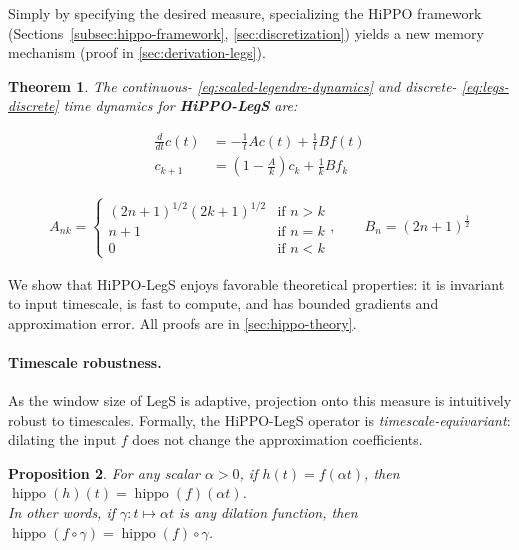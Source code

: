 \documentclass{article}
\newtheorem{theorem}{Theorem}
\newtheorem{proposition}[theorem]{Proposition}
\newcommand{\ddt}{\frac{d}{d t}}
\DeclareMathOperator{\hippo}{hippo}
\begin{document}
Simply by specifying the desired measure, specializing the HiPPO framework (Sections~\ref{subsec:hippo-framework}, \ref{sec:discretization})
yields a new memory mechanism (proof in \cref{sec:derivation-legs}).
\begin{theorem}
  \label{thm:legs}
  The continuous- \eqref{eq:scaled-legendre-dynamics}
  and discrete- \eqref{eq:legs-discrete} time dynamics for \textbf{HiPPO-LegS} are:
  \small

  \begin{minipage}{.35\linewidth}
    \begin{align}
      \ddt c(t) &= -\frac{1}{t} A c(t) + \frac{1}{t} B f(t)
      \label{eq:scaled-legendre-dynamics}
      \\
      c_{k+1} &= \left( 1-\frac{A}{k} \right) c_k + \frac{1}{k} B f_k
     \label{eq:legs-discrete}
    \end{align}
  \end{minipage}\hfill
  \begin{minipage}{.52\linewidth}
    \begin{align*}
      A_{nk}
      =
      \begin{cases}
        (2n+1)^{1/2}(2k+1)^{1/2} & \mbox{if } n > k \\
        n+1 & \mbox{if } n = k \\
        0 & \mbox{if } n < k
      \end{cases},
      \qquad
      B_n = (2n+1)^{\frac{1}{2}}
    \end{align*}
  \end{minipage}
\end{theorem}

We show that HiPPO-LegS enjoys favorable
theoretical properties: it is invariant to input timescale, is fast to compute,
and has bounded gradients and approximation error.
All proofs are in \cref{sec:hippo-theory}.

\paragraph{Timescale robustness.}
As the window size of LegS is adaptive, projection onto this measure is intuitively robust to timescales.
Formally, the HiPPO-LegS operator is \emph{timescale-equivariant}:
dilating the input $f$ does not change the approximation coefficients.
\begin{proposition}
    \label{prop:timescale}
    For any scalar $\alpha > 0$, if $h(t) = f(\alpha t)$, then
    $\hippo(h)(t) = \hippo(f)(\alpha t)$.
    \\ In other words, if $\gamma : t \mapsto \alpha t$ is any dilation function, then
    $\hippo(f \circ \gamma) = \hippo(f) \circ \gamma$.
\end{proposition}
\end{document}
